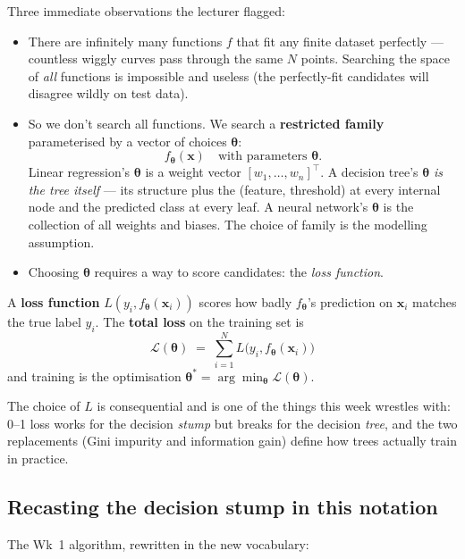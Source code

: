 \documentclass[11pt, a4paper]{article}
\begin{document}
Three immediate observations the lecturer flagged:

\begin{itemize}
  \item There are infinitely many functions $f$ that fit any finite dataset perfectly — countless wiggly curves pass through the same $N$ points. Searching the space of \emph{all} functions is impossible and useless (the perfectly-fit candidates will disagree wildly on test data).
  \item So we don't search all functions. We search a \textbf{restricted family} parameterised by a vector of choices $\boldsymbol\theta$:
  \[
  f_{\boldsymbol\theta}(\mathbf{x}) \quad \text{with parameters } \boldsymbol\theta.
  \]
  Linear regression's $\boldsymbol\theta$ is a weight vector $[w_1, \ldots, w_n]^\top$. A decision tree's $\boldsymbol\theta$ \emph{is the tree itself} — its structure plus the (feature, threshold) at every internal node and the predicted class at every leaf. A neural network's $\boldsymbol\theta$ is the collection of all weights and biases. The choice of family is the modelling assumption.
  \item Choosing $\boldsymbol\theta$ requires a way to score candidates: the \emph{loss function}.
\end{itemize}

\begin{defbox}
A \textbf{loss function} $L(y_i, f_{\boldsymbol\theta}(\mathbf{x}_i))$ scores how badly $f_{\boldsymbol\theta}$'s prediction on $\mathbf{x}_i$ matches the true label $y_i$. The \textbf{total loss} on the training set is
\[
\mathcal{L}(\boldsymbol\theta) \;=\; \sum_{i=1}^{N} L\bigl(y_i, f_{\boldsymbol\theta}(\mathbf{x}_i)\bigr)
\]
and training is the optimisation $\boldsymbol\theta^* = \arg\min_{\boldsymbol\theta} \mathcal{L}(\boldsymbol\theta)$.
\end{defbox}

The choice of $L$ is consequential and is one of the things this week wrestles with: 0--1 loss works for the decision \emph{stump} but breaks for the decision \emph{tree}, and the two replacements (Gini impurity and information gain) define how trees actually train in practice.

\subsection{Recasting the decision stump in this notation}

The Wk~1 algorithm, rewritten in the new vocabulary:
\end{document}
